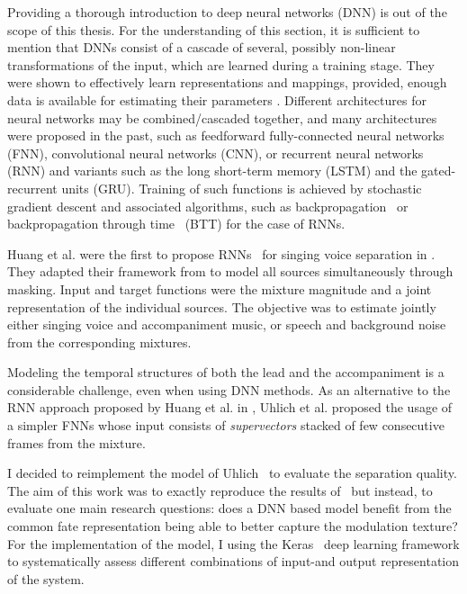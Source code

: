 Providing a thorough introduction to deep neural networks (DNN) is out of the scope of this thesis.
For the understanding of this section, it is sufficient to mention that DNNs consist of a cascade of several, possibly non-linear transformations of the input, which are learned during a training stage.
They were shown to effectively learn representations and mappings, provided, enough data is available for estimating their parameters \cite{deng14, lecun15, goodfellow16}.
Different architectures for neural networks may be combined/cascaded together, and many architectures were proposed in the past, such as feedforward fully-connected neural networks (FNN), convolutional neural networks (CNN), or recurrent neural networks (RNN) and variants such as the long short-term memory (LSTM) and the gated-recurrent units (GRU).
Training of such functions is achieved by stochastic gradient descent \cite{robbins51} and associated algorithms, such as backpropagation~\cite{rumelhart862} or backpropagation through time~\cite{rumelhart86} (BTT) for the case of RNNs.
\par
Huang et al. were the first to propose RNNs~\cite{hermans13,pascanu14} for singing voice separation in \cite{huang14,huang15}. They adapted their framework from \cite{huang142} to model all sources simultaneously through masking. Input and target functions were the mixture magnitude and a joint representation of the individual sources. The objective was to estimate jointly either singing voice and accompaniment music, or speech and background noise from the corresponding mixtures.
\par
Modeling the temporal structures of both the lead and the accompaniment is a considerable challenge, even when using DNN methods. As an alternative to the RNN approach proposed by Huang et al. in \cite{huang14}, Uhlich et al. proposed the usage of a simpler FNNs \cite{uhlich15} whose input consists of \textit{supervectors} stacked of few consecutive frames from the mixture.
\par
I decided to reimplement the model of Uhlich~\cite{uhlich15} to evaluate the separation quality.
The aim of this work was to exactly reproduce the results of~\cite{uhlich15} but instead, to evaluate one main research questions: does a DNN based model benefit from the common fate representation being able to better capture the modulation texture?
For the implementation of the model, I using the Keras~\cite{chollet15} deep learning framework to systematically assess different combinations of input-and output representation of the system.

